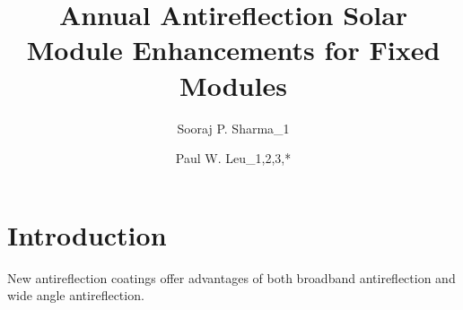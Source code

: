\documentclass[preprint,12pt]{elsarticle}
\begin{document}


\title{Annual Antireflection Solar Module Enhancements for Fixed Modules}



\author{Sooraj P. Sharma_1}

\address{\textsuperscript{1}University of Pittsburgh, Department of Mechanical and Materials Science, Pittsburgh, PA 15261, USA}

\author{Paul W. Leu_{1,2,3,*}}
\address{\textsuperscript{1}University of Pittsburgh, Department of Industrial Engineering, Pittsburgh, PA 15261, USA}
\address{\textsuperscript{2}University of Pittsburgh, Department of Mechanical Engineering and Materials Science, Pittsburgh, PA 15261, USA}
\address{\textsuperscript{3}University of Pittsburgh, Department of Chemical Engineering, Pittsburgh, PA 15261, USA}
\address{\textsuperscript{*}Corresponding Author: pleu@pitt.edu}


\begin{abstract}




\end{abstract}




\section{Introduction}

New antireflection coatings offer advantages of both broadband antireflection and wide angle antireflection.  

\end{document}
